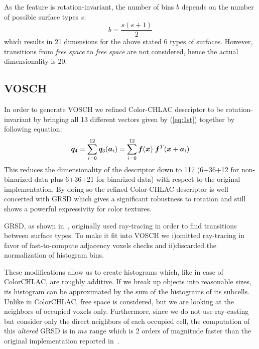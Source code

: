 \documentclass[conference]{sty/IEEEtran}
\begin{document}
As the feature is rotation-invariant, the number of bins $b$ depends on the number of possible 
surface types $s$:
\begin{equation}
b=\frac{s(s+1)}{2}
\end{equation}
which results in 21 dimensions for the above stated 6 types of surfaces. However,
transitions from \emph{free space} to \emph{free space} are not considered, hence
the actual dimensionality is 20.

\subsection{VOSCH}
\label{sec:VOSCH}
In order to generate VOSCH we refined Color-CHLAC descriptor to be rotation-invariant by bringing all  
13 different vectors given by (\ref{eq:1st}) together by following equation: 
\begin{equation}\label{eq:1st_new}
  {\bm q_4} = \sum_{i=0}^{12} {\bm q_3}({\bm a}_i) = \sum_{i=0}^{12} \bm{f}({\bm x}) \hspace{1mm}\bm{f}^T({\bm x}+{\bm a_i}) \\
\end{equation}
%
This reduces the dimensionality of the descriptor down to 117 (6+36+12 for non-binarized data plus 6+36+21 
for binarized data) with respect to the original implementation. 
By doing so the refined Color-CHLAC descriptor is well concerted with GRSD which gives a significant 
robustness to rotation and still shows a powerful expressivity for color textures.

GRSD, as shown in~\cite{GRSD10Humanoids}, originally used
ray-tracing in order to find transitions between surface types. To make it fit into VOSCH 
we i)omitted ray-tracing in favor of fast-to-compute adjacency voxels checks and ii)discarded
the normalization of histogram bins.

These modifications allow us to create histograms which, like in case of ColorCHLAC, are roughly additive.
If we break up objects into reasonable sizes, its histogram can be approximated by the sum of the
histograms of its subcells. Unlike in ColorCHLAC, free space is considered, but we are looking
at the neighbors of occupied voxels only. Furthermore, since we do not use ray-casting but 
consider only the direct neighbors of each occupied cell, the computation of this \emph{altered} GRSD is in 
$ms$ range which is 2 orders of magnitude faster than the original implementation
reported in~\cite{GRSD10Humanoids}.
\end{document}
